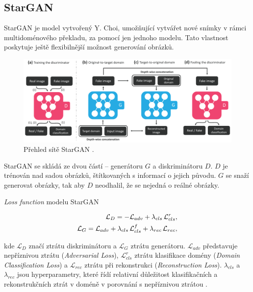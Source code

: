\newpage

\subsection*{StarGAN}

StarGAN \cite{choi2018stargan} je model vytvořený Y. Choi, umožňující vytvářet nové snímky v rámci multidoménového překladu, za pomocí jen jednoho modelu. Tato vlastnost poskytuje ještě flexibilnější možnost generování obrázků.

\begin{figure}[hbt]
	\centering
	\includegraphics[width=1\textwidth]{obrazky-figures/stargan_overview.pdf}
	\caption{Přehled sítě StarGAN \cite{choi2018stargan}.}
        \label{fig:stargan}
\end{figure}

\noindent StarGAN se skládá ze dvou částí -- generátoru $G$ a diskriminátoru $D$. $D$ je trénován nad sadou obrázků, štítkovaných s informací o jejich původu. $G$ se snaží generovat obrázky, tak aby $D$ neodhalil, že se nejedná o reálné obrázky.

\noindent\textit{Loss function} modelu StarGAN

\begin{align}
    \mathcal{L}_{D} =  - \mathcal {L}_{adv} +  {\lambda}_{cls}\thinspace\mathcal{L}_{cls}^{r}, \\
    \mathcal{L}_{G} =   \mathcal {L}_{adv} +  {\lambda}_{cls}\thinspace\mathcal{L}_{cls}^{f} + 
    {\lambda}_{rec}\thinspace\mathcal{L}_{rec},
    \label{eq:StarGANObj}
\end{align}

kde $\mathcal{L}_{D}$ značí ztrátu diskriminátoru a $\mathcal{L}_{G}$ ztrátu generátoru. $\mathcal {L}_{adv}$ představuje nepříznivou ztrátu (\textit{Adversarial Loss}), $\mathcal{L}_{cls}^{r}$ ztrátu klasifikace domény (\textit{Domain Classification Loss}) a $\mathcal{L}_{rec}$ ztrátu při rekonstrukci (\textit{Reconstruction Loss}). ${\lambda}_{cls}$ a ${\lambda}_{rec}$ jsou hyperparametry, které řídí relativní důležitost klasifikačních a rekonstrukčních ztrát v doméně v porovnání s nepříznivou ztrátou \cite{choi2018stargan}.


